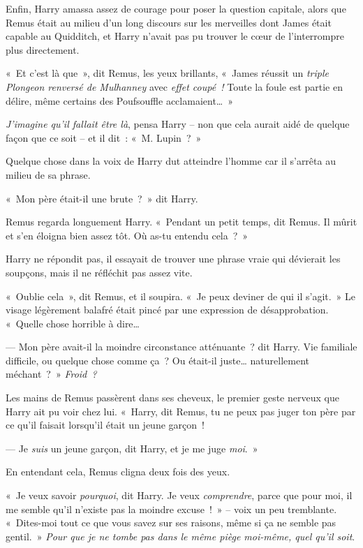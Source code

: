 Enfin, Harry amassa assez de courage pour poser la question capitale, alors que Remus était au milieu d'un long discours sur les merveilles dont James était capable au Quidditch, et Harry n'avait pas pu trouver le cœur de l'interrompre plus directement.

«~Et c'est là que~», dit Remus, les yeux brillants, «~James réussit un \emph{triple Plongeon renversé de Mulhanney} avec \emph{effet coupé~!} Toute la foule est partie en délire, même certains des Poufsouffle acclamaient…~»

\emph{J'imagine qu'il fallait être là}, pensa Harry -- non que cela aurait aidé de quelque façon que ce soit -- et il dit~: «~M. Lupin~?~»

Quelque chose dans la voix de Harry dut atteindre l'homme car il s'arrêta au milieu de sa phrase.

«~Mon père était-il une brute~?~» dit Harry.

Remus regarda longuement Harry. «~Pendant un petit temps, dit Remus. Il mûrit et s'en éloigna bien assez tôt. Où as-tu entendu cela~?~»

Harry ne répondit pas, il essayait de trouver une phrase vraie qui dévierait les soupçons, mais il ne réfléchit pas assez vite.

«~Oublie cela~», dit Remus, et il soupira. «~Je peux deviner de qui il s'agit.~» Le visage légèrement balafré était pincé par une expression de désapprobation. «~Quelle chose horrible à dire…

--- Mon père avait-il la moindre circonstance atténuante~? dit Harry. Vie familiale difficile, ou quelque chose comme ça~? Ou était-il juste… naturellement méchant~?~» \emph{Froid~?}

Les mains de Remus passèrent dans ses cheveux, le premier geste nerveux que Harry ait pu voir chez lui. «~Harry, dit Remus, tu ne peux pas juger ton père par ce qu'il faisait lorsqu'il était un jeune garçon~!

--- Je \emph{suis} un jeune garçon, dit Harry, et je me juge \emph{moi}.~»

En entendant cela, Remus cligna deux fois des yeux.

«~Je veux savoir \emph{pourquoi}, dit Harry. Je veux \emph{comprendre}, parce que pour moi, il me semble qu'il n'existe pas la moindre excuse~!~» -- voix un peu tremblante. «~Dites-moi tout ce que vous savez sur ses raisons, même si ça ne semble pas gentil.~» \emph{Pour que je ne tombe pas dans le même piège moi-même, quel qu'il soit}.

